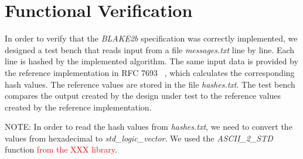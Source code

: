 \documentclass[%
	a4paper,
]
{article}
\newcommand{\todo}[1]{\textcolor{red}{#1}}
\begin{document}
%
%
%
%
\section{Functional Verification}
\label{sec:functional-verification}

In order to verify that the \emph{BLAKE2b} specification was correctly
implemented, we designed a test bench that reads input from a file
\emph{messages.txt} line by line.
%
Each line is hashed by the implemented algorithm. The same input
data is provided by the reference implementation in RFC 7693~%
\autocite{rfc7693}, which calculates the corresponding hash values. The
reference values are stored in the file \emph{hashes.txt}.
%
The test bench compares the output created by the design under test to
the reference values created by the reference implementation.
%

NOTE: In order to read the hash values from \emph{hashes.txt}, we need to
convert the values from hexadecimal to \emph{std_logic_vector}. We used the
\emph{ASCII_2_STD} function \todo{from the XXX library}.

\end{document}
